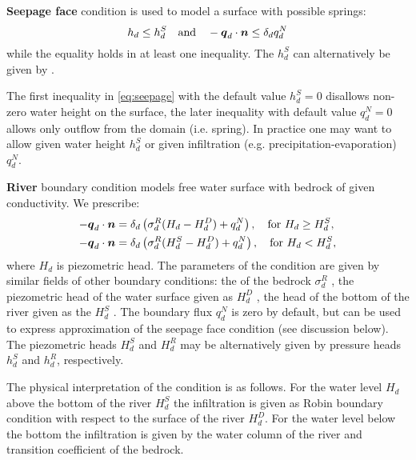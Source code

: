 {\bf Seepage face} condition is used to model a surface with possible springs:
\begin{equation}\label{eq:seepage}
    h_d \le h_d^S\quad \text{and} \quad -\vc q_d \cdot \vc n \le \delta_d q_d^N
\end{equation}
while the equality holds in at least one inequality. The  
$h_d^S$  can alternatively be given by .

The first inequality in \eqref{eq:seepage}
with the default value $h_d^S=0$ disallows non-zero water height on the surface, the later
inequality with default value $q_d^N=0$ allows only outflow from the domain (i.e. spring).
In practice one may want to allow given water height $h_d^S$ or given infiltration (e.g. precipitation-evaporation) $q_d^N$.

{\bf River} boundary condition models free water surface with bedrock of given conductivity. 
We prescribe:
\begin{align}
  -\mathbf{\boldsymbol{q}}_d \cdot \mathbf{\boldsymbol{n}} &= \delta_d\left(\sigma_d^R ( H_d - H_d^D) + q_d^N\right), \quad \text{for } H_d \ge H_d^S,\\
  -\mathbf{\boldsymbol{q}}_d \cdot \mathbf{\boldsymbol{n}} &= \delta_d\left(\sigma_d^R ( H_d^S - H_d^D)+q_d^N\right), \quad \text{for } H_d < H_d^S,
\end{align}
where $H_d$ is piezometric head.
The parameters of the condition are given by similar fields of other boundary conditions: 
the  of the bedrock $\sigma_d^R$ , 
the piezometric head of the water surface given as   $H_d^D$ ,
the head of the bottom of the river given as the  
$H_d^S$ . The boundary flux $q_d^N$ is zero by default, but can be used to express approximation of the seepage face condition 
(see discussion below).  The piezometric heads  $H_d^S$ and $H_d^R$ may be alternatively 
given by pressure heads $h_d^S$ and $h_d^R$, respectively.

The physical interpretation of the condition is as follows. For the water level $H_d$ above the bottom of the river $H_d^S$ the infiltration is given 
as Robin boundary condition with respect to the surface of the river $H_d^D$. 
For the water level below the bottom the infiltration is given by the water column of the river and transition coefficient of the bedrock.

